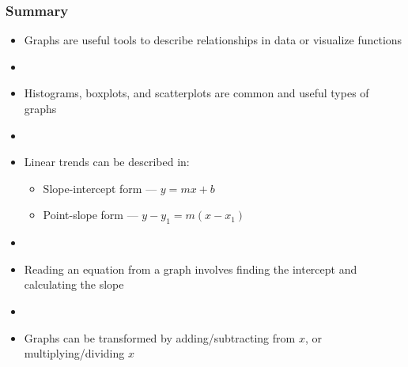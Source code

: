 \documentclass[11pt]{beamer}
\newcommand{\myframe}[1]{\begin{frame} \frametitle{#1}}
\begin{document}
\myframe{Summary}
\begin{itemize}
\item Graphs are useful tools to describe relationships in data or visualize functions
\item[]
\item Histograms, boxplots, and scatterplots are common and useful types of graphs
\item[]
\item Linear trends can be described in:
\begin{itemize}
\item Slope-intercept form --- $y = mx + b$
\item Point-slope form --- $y - y_1 = m(x - x_1)$
\end{itemize}
\item[]
\item Reading an equation from a graph involves finding the intercept and calculating the slope
\item[]
\item Graphs can be transformed by adding/subtracting from $x$, or multiplying/dividing $x$
\end{itemize}
\end{frame}
\end{document}

